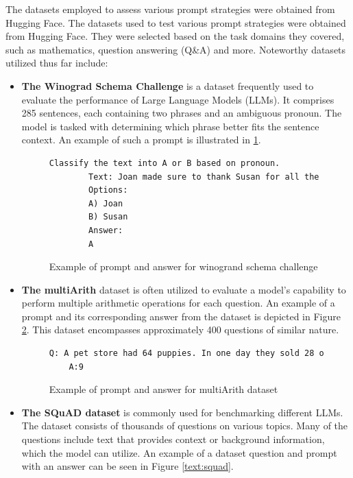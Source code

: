 \documentclass[fleqn,moreauthors,10pt]{ds_report}
\begin{document}
The datasets employed to assess various prompt strategies were obtained from Hugging Face. The datasets used to test various prompt strategies were obtained from Hugging Face. They were selected based on the task domains they covered, such as mathematics, question answering (Q\&A) and more. Noteworthy datasets utilized thus far include:

\begin{itemize}
    \item \textbf{The Winograd Schema Challenge} is a dataset frequently used to evaluate the performance of Large Language Models (LLMs). It comprises 285 sentences, each containing two phrases and an ambiguous pronoun. The model is tasked with determining which phrase better fits the sentence context. An example of such a prompt is illustrated in \ref{text:winogrand1}.

    \begin{figure}[htbp]
    \centering
    \begin{lstlisting}[language=TeX]
    Classify the text into A or B based on pronoun.
        Text: Joan made sure to thank Susan for all the help she had recieved.
        Options:
        A) Joan
        B) Susan
        Answer:
        A
    \end{lstlisting}
    \caption{Example of prompt and answer for winogrand schema challenge}
    \label{text:winogrand1}
    \end{figure}

    \item \textbf{The multiArith} dataset is often utilized to evaluate a model's capability to perform multiple arithmetic operations for each question. An example of a prompt and its corresponding answer from the dataset is depicted in Figure \ref{text:multArth}. This dataset encompasses approximately 400 questions of similar nature.

    \begin{figure}[htbp]
    \centering
    \begin{lstlisting}[language=TeX]
    Q: A pet store had 64 puppies. In one day they sold 28 of them and put the rest into cages with 4 in each cage. How many cages did they use? 
    A:9
    \end{lstlisting}
    \caption{Example of prompt and answer for multiArith dataset}
    \label{text:multArth}
    \end{figure}

    \item \textbf{The SQuAD dataset} is commonly used for benchmarking different LLMs. The dataset consists of thousands of questions on various topics. Many of the questions include text that provides context or background information, which the model can utilize. An example of a dataset question and prompt with an answer can be seen in Figure \ref{text:squad}.


\end{itemize}
\end{document}
